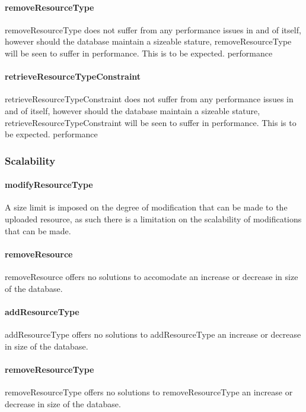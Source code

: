 \documentclass[a4paper]{article}
\begin{document}
\paragraph{removeResourceType}
removeResourceType does not suffer from any performance issues in and of itself, however should the database maintain a sizeable stature, removeResourceType will be seen to suffer in performance. This is to be expected.
performance

\paragraph{retrieveResourceTypeConstraint}
retrieveResourceTypeConstraint does not suffer from any performance issues in and of itself, however should the database maintain a sizeable stature, retrieveResourceTypeConstraint will be seen to suffer in performance. This is to be expected.
performance

\subsubsection {Scalability}

\paragraph{modifyResourceType}
A size limit is imposed on the degree of modification that can be made to the uploaded resource, as such there is a limitation on the scalability of modifications that can be made.

\paragraph{removeResource}
removeResource offers no solutions to accomodate an increase or decrease in size of the database.

\paragraph{addResourceType}
addResourceType offers no solutions to addResourceType an increase or decrease in size of the database.

\paragraph{removeResourceType}
removeResourceType offers no solutions to removeResourceType an increase or decrease in size of the database.
\end{document}
